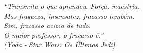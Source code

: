 \begin{epigrafe}
  \vspace*{\fill}
  \begin{flushright}
    \textit{``Transmita o que aprendeu. Força, maestria. \\
      Mas fraqueza, insensatez, fracasso também.\\
      Sim, fracasso acima de tudo.\\
      O maior professor, o fracasso é.''\\
      (Yoda - Star Wars: Os Últimos Jedi)}
  \end{flushright}
\end{epigrafe}
